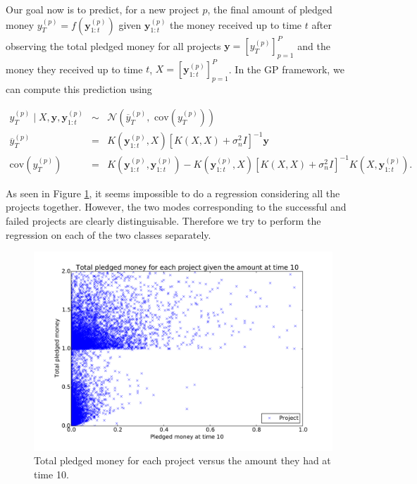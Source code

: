 \documentclass[11pt, oneside]{article}   	%
\begin{document}
        			Our goal now is to predict, for a new project $p$, the final amount of pledged money $y_T^{(p)} = f(\mathbf{y}_{1:t}^{(p)})$ given $\mathbf{y}_{1:t}^{(p)}$ the money received up to time $t$ after observing the total pledged money for all projects $\mathbf{y} = \left[y_T^{(p)}\right]_{p=1}^P$ and the money they received up to time $t$, $X = \left[ \mathbf{y}_{1:t}^{(p)} \right]_{p=1}^P$. In the GP framework, we can compute this prediction using
        			 
			 \begin{eqnarray}
			 	y_T^{(p)} \mid X, \mathbf{y}, \mathbf{y}_{1:t}^{(p)} 	& \sim & 	\mathcal{N}\left(\overline{y}_T^{(p)}, \text{ cov}(y_T^{(p)})  \right) \\
                            	\overline{y}_T^{(p)}							& = &	K(\mathbf{y}_{1:t}^{(p)}, X) \left[ K(X, X) + \sigma_n^2I \right]^{-1}\mathbf{y} \\
                            	 \text{cov}(y_T^{(p)}) 						& = & 	K(\mathbf{y}_{1:t}^{(p)}, \mathbf{y}_{1:t}^{(p)}) - K(\mathbf{y}_{1:t}^{(p)}, X)\left[ K(X, X) + \sigma_n^2I \right]^{-1}K(X, \mathbf{y}_{1:t}^{(p)}).
                            \end{eqnarray}

                                   
        			As seen in Figure \ref{fig:input_output_global}, it seems impossible to do a regression considering all the projects together. However, the two modes corresponding to the successful and failed projects are clearly distinguisable. Therefore we try to perform the regression on each of the two classes separately. 
			
			\begin{figure}[h]
                        		\begin{center}
                        			\includegraphics[scale=0.5]{img/input_output_global}
                        			\caption{Total pledged money for each project versus the amount they had at time 10.}
                       		 	\label{fig:input_output_global}
                       	 	\end{center}
                        	\end{figure}
        
\end{document}
